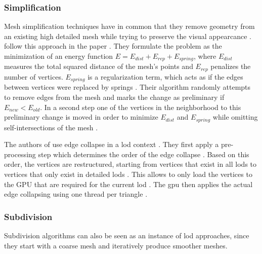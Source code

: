 \subsubsection*{Simplification}
Mesh simplification techniques have in common that they remove geometry from an existing high detailed mesh while trying to preserve the visual appearcance \cite[p. 706]{realtime}.
\citeauthor{hoppe_simplification} follow this approach in the paper  \cite{hoppe_simplification}.
They formulate the problem as the minimization of an energy function $E = E_{dist} + E_{rep} + E_{spring}$, where $E_{dist}$ measures the total squared distance of the mesh's points and $E_{rep}$ penalizes the number of vertices.
$E_{spring}$ is a regularization term, which acts as if the edges between vertices were replaced by springs \cite{hoppe_simplification}.
Their algorithm randomly attempts to remove edges from the mesh and marks the change as preliminary if $E_{new} < E_{old}$.
In a second step one of the vertices in the neighborhood to this preliminary change is moved in order to minimize $E_{dist}$ and $E_{spring}$ while omitting self-intersections of the mesh \cite{hoppe_simplification}.

The authors of  use edge collapse in a \ac{lod} context \cite{peng_simplification}.
They first apply a pre-processing step which determines the order of the edge collapse \cite{peng_simplification}.
Based on this order, the vertices are restructured, starting from vertices that exist in all \acp{lod} to vertices that only exist in detailed \acp{lod} \cite{peng_simplification}.
This allows to only load the vertices to the GPU that are required for the current \ac{lod} \cite{peng_simplification}.
The \ac{gpu} then applies the actual edge collapsing using one thread per triangle \cite{peng_simplification}.

\subsubsection*{Subdivision}
Subdivision algorithms can also be seen as an instance of \ac{lod} approaches, since they start with a coarse mesh and iteratively produce smoother meshes.

